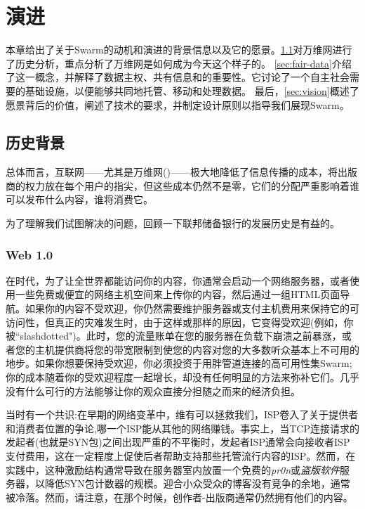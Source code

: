 \chapter{演进\statusgreen}\label{chap:vision}



本章给出了关于Swarm的动机和演进的背景信息以及它的愿景。\ref{sec:historical_context}对万维网进行了历史分析，重点分析了万维网是如何成为今天这个样子的。
\ref{sec:fair-data}介绍了这一概念，并解释了数据主权、共有信息和的重要性。它讨论了一个自主社会需要的基础设施，以便能够共同地托管、移动和处理数据。
最后，\ref{sec:vision}概述了愿景背后的价值，阐述了技术的要求，并制定设计原则以指导我们展现Swarm。

\section{历史背景\statusgreen}\label{sec:historical_context}
\green{}
总体而言，互联网——尤其是万维网()——极大地降低了信息传播的成本，将出版商的权力放在每个用户的指尖，但这些成本仍然不是零，它们的分配严重影响着谁可以发布什么内容，谁将消费它。

为了理解我们试图解决的问题，回顾一下联邦储备银行的发展历史是有益的。

\subsection{Web 1.0 \statusgreen}\label{sec:web_1}

在时代，为了让全世界都能访问你的内容，你通常会启动一个网络服务器，或者使用一些免费或便宜的网络主机空间来上传你的内容，然后通过一组HTML页面导航。如果你的内容不受欢迎，你仍然需要维护服务器或支付主机费用来保持它的可访问性，但真正的灾难发生时，由于这样或那样的原因，它变得受欢迎(例如，你被“slashdotted")。此时，您的流量账单在您的服务器在负载下崩溃之前暴涨，或者您的主机提供商将您的带宽限制到使您的内容对您的大多数听众基本上不可用的地步。如果你想要保持受欢迎，你必须投资于用胖管道连接的高可用性集Swarm;你的成本随着你的受欢迎程度一起增长，却没有任何明显的方法来弥补它们。几乎没有什么可行的方法能够让你的观众直接分担随之而来的经济负担。

当时有一个共识:在早期的网络变革中，维有可以拯救我们，ISP卷入了关于提供者和消费者位置的争论,哪一个ISP能从其他的网络赚钱。事实上，当TCP连接请求的发起者(也就是SYN包)之间出现严重的不平衡时，发起者ISP通常会向接收者ISP支付费用，这在一定程度上促使后者帮助支持那些托管流行内容的ISP。然而，在实践中，这种激励结构通常导致在服务器室内放置一个免费的\emph{pr0n}或\emph{盗版软件}服务器，以降低SYN包计数器的规模。迎合小众受众的博客没有竞争的余地，通常被冷落。然而，请注意，在那个时候，创作者-出版商通常仍然拥有他们的内容。

